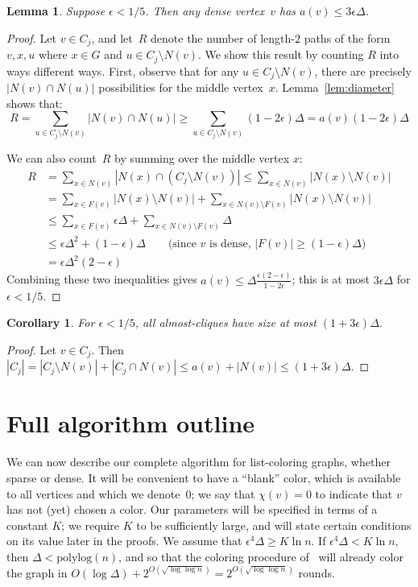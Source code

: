 \documentclass[11pt]{amsart}
\newtheorem{lemma}[theorem]{Lemma}
\newtheorem{corollary}[theorem]{Corollary}
\begin{document}
\begin{lemma}
\label{network2}
Suppose $\epsilon < 1/5$. Then any dense vertex~$v$ has $a(v) \leq 3 \epsilon \Delta$.
\end{lemma}
\begin{proof}
Let $v \in C_j$, and let~$R$ denote the number of length-$2$ paths of the form~$v, x, u$ where $x \in G$ and $u \in C_j \setminus N(v).$ We show this result by counting $R$ into ways different ways. First, observe that for any $u \in C_j \setminus N(v)$, there are precisely $|N(v) \cap N(u)|$ possibilities for the middle vertex~$x$. Lemma~\ref{lem:diameter} shows that:
$$
R = \sum_{u \in C_j \setminus N(v)} |N(v) \cap N(u)| \geq \sum_{u \in C_j \setminus N(v)} (1 - 2 \epsilon) \Delta = a(v) (1 - 2 \epsilon) \Delta
$$

We can also count~$R$ by summing over the middle vertex $x$:
\begin{align*}
R &= \sum_{x \in N(v)} |N(x) \cap ( C_j \setminus N(v))| \leq \sum_{x \in N(v)} |N(x) \setminus N(v)| \\
&= \sum_{x \in F(v)} |N(x) \setminus N(v)| +  \sum_{x \in N(v) \setminus F(v)} |N(x) \setminus N(v)| \\
&\leq \sum_{x \in F(v)} \epsilon \Delta +  \sum_{x \in N(v) \setminus F(v)} \Delta \\
&\leq \epsilon \Delta^2 + (1 - \epsilon)\Delta \qquad \text{(since $v$ is dense, $|F(v)| \geq (1 - \epsilon) \Delta$)} \\
&= \epsilon\Delta^2 (2 - \epsilon) 
\end{align*}
Combining these two inequalities gives $a(v) \leq \Delta \frac{\epsilon (2 - \epsilon)}{1 - 2 \epsilon}$; this is at most $3 \epsilon \Delta$ for $\epsilon < 1/5$.
\end{proof}

\begin{corollary}
For $\epsilon < 1/5$, all almost-cliques have size at most $(1 + 3 \epsilon) \Delta$.
\end{corollary}
\begin{proof}
Let $v \in C_j$. Then $|C_j| = |C_j \setminus N(v)| + |C_j \cap N(v)| \leq a(v) + |N(v)| \leq (1 + 3 \epsilon) \Delta$.
\end{proof}


\section{Full algorithm outline}
\label{full-algorithm-sec}
We can now describe our complete algorithm for list-coloring graphs, whether sparse or dense. It will be convenient to have a ``blank'' color, which is available to all vertices and which we denote~$0$; we say that $\chi(v) = 0$ to indicate that $v$ has not (yet) chosen a color. Our parameters will be specified in terms of a constant $K$; we require $K$ to be sufficiently large, and will state certain conditions on its value later in the proofs. We assume that $\epsilon^4 \Delta \geq K \ln n$. If $\epsilon^{4} \Delta <  K \ln n$, then $\Delta < \text{polylog}(n)$, and so that the coloring procedure of~\cite{BEPS16} will already color the graph in $O(\log \Delta) +2^{O(\sqrt{\log \log n})} = 2^{O(\sqrt{\log \log n})}$ rounds.
\end{document}
